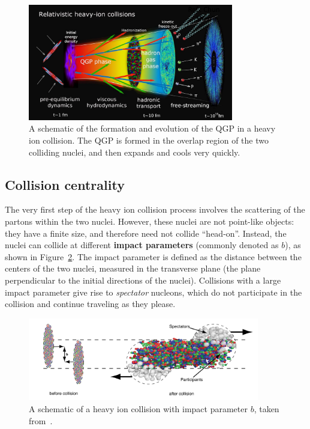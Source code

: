 \begin{figure}[ht!]
    \centering
    \includegraphics[width=0.8\textwidth]{figures/introduction/heavy_ion_phases.png}
    \caption{A schematic of the formation and evolution of the QGP in a heavy ion collision. The QGP is formed in the overlap region of the two colliding nuclei, and then expands and cools very quickly.}
    \label{fig:qgp_evolution}
\end{figure}

\subsection{Collision centrality}
\label{sec:collision_centrality}

The very first step of the heavy ion collision process involves the scattering of the partons within the two nuclei. However, these nuclei are not point-like objects: they have a finite size, and therefore need not collide ``head-on''. Instead, the nuclei can collide at different \textbf{impact parameters} (commonly denoted as $b$), as shown in Figure~\ref{fig:impact_parameter}. The impact parameter is defined as the distance between the centers of the two nuclei, measured in the transverse plane (the plane perpendicular to the initial directions of the nuclei). Collisions with a large impact parameter give rise to \textit{spectator} nucleons, which do not participate in the collision and continue traveling as they please.

\begin{figure}[ht]
    \centering
    \includegraphics[width=0.9\textwidth]{figures/introduction/impact_parameter.png}
    \caption{A schematic of a heavy ion collision with impact parameter $b$, taken from~\cite{CERNCourierImpactParam}.}
    \label{fig:impact_parameter}
\end{figure}

